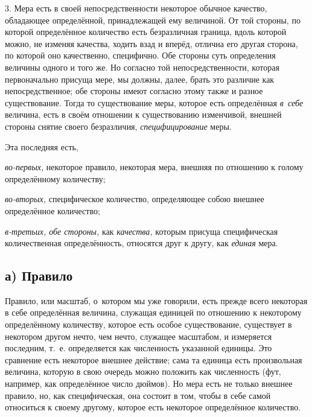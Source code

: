 3. Мера есть в своей непосредственности некоторое обычное качество, обладающее
определённой, принадлежащей ему величиной. От той стороны, по которой
определённое количество есть безразличная граница, вдоль которой можно, не
изменяя качества, ходить взад и вперёд, отлична его другая сторона, по которой
оно качественно, специфично. Обе стороны суть определения величины одного и
того же. Но согласно той непосредственности, которая первоначально присуща
мере, мы должны, далее, брать это различие как непосредственное; обе стороны
имеют согласно этому также и разное существование. Тогда то существование меры,
которое есть определённая {\em в~себе} величина, есть в своём отношении к
существованию изменчивой, внешней стороны снятие своего безразличия,
{\em специфицирование} меры.


Эта последняя есть,

{\em во-первых,} некоторое правило, некоторая мера, внешняя
по отношению к голому определённому количеству;

{\em во-вторых,} специфическое количество, определяющее собою внешнее
определённое количество;

{\em в-третьих, обе стороны,} как {\em качества,} которым присуща
специфическая количественная определённость, относятся друг к другу, как
{\em единая} мера.

\subsection[а) Правило]{а) Правило}

Правило, или масштаб, о~котором мы уже говорили, есть прежде всего некоторая в
себе определённая величина, служащая единицей по отношению к некоторому
определённому количеству, которое есть особое существование, существует в
некотором другом нечто, чем нечто, служащее масштабом, и измеряется последним,
т.~е. определяется как численность указанной единицы. Это сравнение есть
некоторое внешнее действие; сама та единица есть произвольная величина, которую
в свою очередь можно положить как численность (фут, например, как определённое
число дюймов). Но мера есть не только внешнее правило, но, как специфическая,
она состоит в том, чтобы в себе самой относиться к своему другому, которое есть
некоторое определённое количество.

